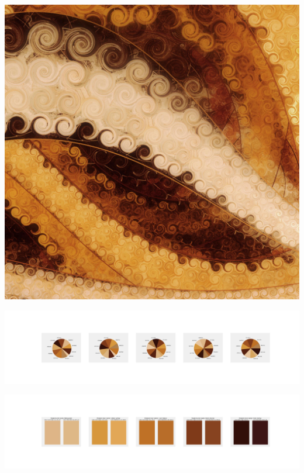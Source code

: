 \documentclass[11pt]{article}
\begin{document}
\begin{landscape}
    \begin{center}
    \includegraphics[width=\textwidth]{./nbimg/file (337).jpg}
    \end{center}

    \begin{center}
    \includegraphics[width=250mm]{./nbimg/pie-264.jpg}
    \end{center}

    \begin{center}
    \includegraphics[width=250mm]{./nbimg/peak-264.jpg}
    \end{center}
    


\end{landscape}
\end{document}
